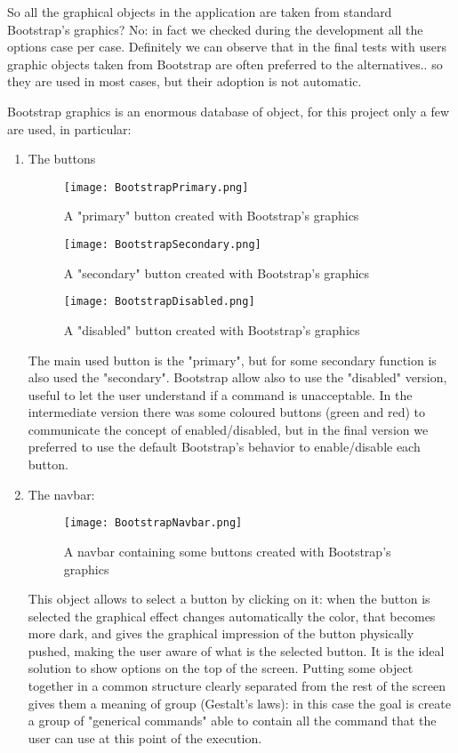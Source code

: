 So all the graphical objects in the application are taken from standard Bootstrap's graphics? No: in fact we checked during the development all the options case per case. Definitely we can observe that in the final tests with users graphic objects taken from Bootstrap are often preferred to the alternatives.. so they are used in most cases, but their adoption is not automatic.  

Bootstrap graphics is an enormous database of object, for this project only a few are used, in particular:

\begin{enumerate}

\item The buttons

\begin{figure}[H]
\centering
\texttt{[image: BootstrapPrimary.png]} 
\caption{A "primary" button created with Bootstrap's graphics}
\end{figure}

\begin{figure}[H]
\centering
\texttt{[image: BootstrapSecondary.png]} 
\caption{A "secondary" button created with Bootstrap's graphics}
\end{figure}

\begin{figure}[H]
\centering
\texttt{[image: BootstrapDisabled.png]} 
\caption{A "disabled" button created with Bootstrap's graphics}
\end{figure}

The main used button is the "primary", but for some secondary function is also used the "secondary". Bootstrap allow also to use the "disabled" version, useful to let the user understand if a command is unacceptable. In the intermediate version there was some coloured buttons (green and red) to communicate the concept of enabled/disabled, but in the final version we preferred to use the default Bootstrap's behavior to enable/disable each button. 
 

\item The navbar:

\begin{figure}[H]
\centering
\texttt{[image: BootstrapNavbar.png]} 
\caption{A navbar containing some buttons created with Bootstrap's graphics}
\end{figure}

This object allows to select a button by clicking on it: when the button is selected the graphical effect changes automatically the color, that becomes more dark, and gives the graphical impression of the button physically pushed, making the user aware of what is the selected button. It is the ideal solution to show options on the top of the screen. 
Putting some object together in a common structure clearly separated from the rest of the screen gives them a meaning of group (Gestalt's laws): in this case the goal is create a group of "generical commands" able to contain all the command that the user can use at this point of the execution.  



\end{enumerate}
